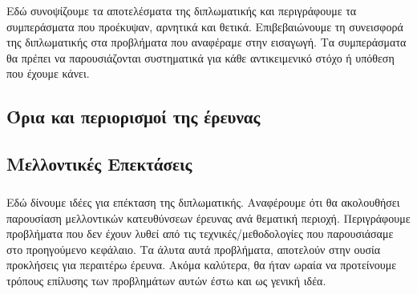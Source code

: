 \documentclass[12pt]{article}
\begin{document}
Εδώ συνοψίζουμε τα αποτελέσματα της διπλωματικής και περιγράφουμε τα συμπεράσματα που προέκυψαν, αρνητικά και θετικά. Επιβεβαιώνουμε τη συνεισφορά της διπλωματικής στα προβλήματα που αναφέραμε στην εισαγωγή. Τα συμπεράσματα θα πρέπει να παρουσιάζονται συστηματικά για κάθε αντικειμενικό στόχο ή υπόθεση που έχουμε κάνει.

\subsection{Όρια και περιορισμοί της έρευνας}
\subsection{Μελλοντικές Επεκτάσεις}
\subparagraph{}
Εδώ δίνουμε ιδέες για επέκταση της διπλωματικής. Αναφέρουμε ότι θα ακολουθήσει παρουσίαση μελλοντικών κατευθύνσεων έρευνας ανά θεματική περιοχή. Περιγράφουμε προβλήματα που δεν έχουν λυθεί από τις τεχνικές/μεθοδολογίες που παρουσιάσαμε στο προηγούμενο κεφάλαιο. Τα άλυτα αυτά προβλήματα, αποτελούν στην ουσία προκλήσεις για περαιτέρω έρευνα. Ακόμα καλύτερα, θα ήταν ωραία να προτείνουμε τρόπους επίλυσης των προβλημάτων αυτών έστω και ως γενική ιδέα.

\clearpage
{}

 
 
\end{document}
